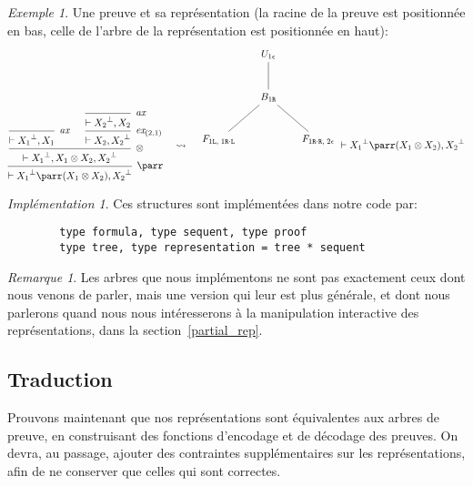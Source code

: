 \documentclass[11pt,a4paper]{article}
\theoremstyle{plain}
\theoremstyle{definition}
\theoremstyle{remark}
\newtheorem{remark}{Remarque}
\newtheorem{example}{Exemple}
\newtheorem{implementation}{Implémentation}
\newcommand*{\orth}{^\perp}
\newcommand*{\tensor}{\otimes}
\newcommand*{\axv}[1]{\infer{0}[\ensuremath{\mathit{ax}}]{\vdash #1}}
\newcommand*{\tensorv}[1]{\infer{2}[\ensuremath{\tensor}]{\vdash #1}}
\newcommand*{\parrv}[1]{\infer{1}[\ensuremath{\parr}]{\vdash #1}}
\newcommand*{\permv}[2]{\infer{1}[\ensuremath{\textit{ex}_{#1}}]{\vdash #2}}
\newcommand*{\Left}{\textnormal{\texttt{L}}}
\newcommand*{\Right}{\textnormal{\texttt{R}}}
\begin{document}
\begin{example}
\label{rep_example}
Une preuve et sa représentation (la racine de la preuve est positionnée en bas, celle de l'arbre de la représentation est positionnée en haut):
\begin{equation*}
\begin{prooftree}
    \axv{{X_1}\orth, X_1}
    \axv{{X_2}\orth, X_2}
    \permv{(2, 1)}{X_2, {X_2}\orth}
    \tensorv{{X_1}\orth, X_1 \tensor X_2, {X_2}\orth}
    \parrv{{X_1}\orth \parr (X_1 \tensor X_2), {X_2}\orth}
\end{prooftree}
\quad\leadsto\quad
\begin{tikzpicture}%
    [level 2/.style={sibling distance=3.5cm}]
    \node {$U_{1 \epsilon}$}
    child {node {$B_{1 \Right}$}
        child {node {$F_{1 \Left, \; 1 \Right \cdot \Left}$}}
        child {node {$F_{1 \Right \cdot \Right, \; 2 \epsilon}$}}
    };
\end{tikzpicture}
\vdash {X_1}\orth \parr (X_1 \tensor X_2), {X_2}\orth
\end{equation*}
\end{example}

\begin{implementation}
    Ces structures sont implémentées dans notre code par:
    
    \label{implement_trees}
    \begin{verbatim}
        type formula, type sequent, type proof
        type tree, type representation = tree * sequent
    \end{verbatim}

    \begin{remark}
        Les arbres que nous implémentons ne sont pas exactement ceux dont nous venons de parler, mais une version qui leur est plus générale, et dont nous parlerons quand nous nous intéresserons à la manipulation interactive des représentations, dans la section~\ref{partial_rep}.
    \end{remark}

\end{implementation}

\subsection{Traduction}
Prouvons maintenant que nos représentations sont équivalentes aux arbres de preuve, en construisant des fonctions d'encodage et de décodage des preuves. On devra, au passage, ajouter des contraintes supplémentaires sur les représentations, afin de ne conserver que celles qui sont correctes.
\end{document}
